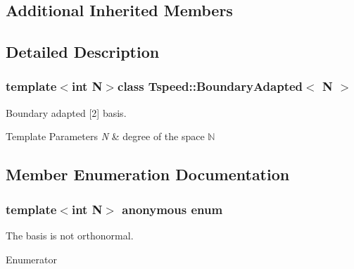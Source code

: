 \subsection*{Additional Inherited Members}


\subsection{Detailed Description}
\subsubsection*{template$<$int N$>$class Tspeed\-::\-Boundary\-Adapted$<$ N $>$}

Boundary adapted \mbox{[}2\mbox{]} basis. 


\begin{DoxyTemplParams}{Template Parameters}
{\em N} & degree of the space $\mathbb{N}$ \\
\hline
\end{DoxyTemplParams}


\subsection{Member Enumeration Documentation}
\hypertarget{classTspeed_1_1BoundaryAdapted_a43bbb02cefcd3061b7b85ee061d0fe21}{\subsubsection[{anonymous enum}]{\setlength{\rightskip}{0pt plus 5cm}template$<$int N$>$ anonymous enum}}\label{classTspeed_1_1BoundaryAdapted_a43bbb02cefcd3061b7b85ee061d0fe21}


The basis is not orthonormal. 

\begin{Desc}
\item[Enumerator]\par
\begin{description}
\item[{\em 
\hypertarget{classTspeed_1_1BoundaryAdapted_a43bbb02cefcd3061b7b85ee061d0fe21a14fd943d0e78f08196b5f0f9e05232ce}{is\-\_\-orthonormal}\label{classTspeed_1_1BoundaryAdapted_a43bbb02cefcd3061b7b85ee061d0fe21a14fd943d0e78f08196b5f0f9e05232ce}
}]\end{description}
\end{Desc}


